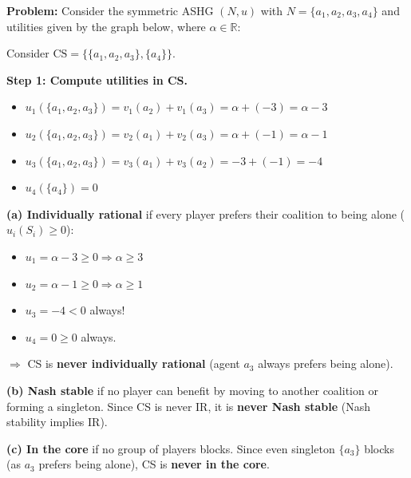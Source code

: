 \begin{exbox}
\textbf{Problem:} Consider the symmetric ASHG $(N, u)$ with $N = \{a_1, a_2, a_3, a_4\}$ and utilities given by the graph below, where $\alpha \in \mathbb{R}$:

\begin{center}
\end{center}

Consider $\text{CS} = \{\{a_1, a_2, a_3\}, \{a_4\}\}$.

\textbf{Step 1: Compute utilities in CS.}
\begin{itemize}
  \item $u_1(\{a_1,a_2,a_3\}) = v_1(a_2) + v_1(a_3) = \alpha + (-3) = \alpha - 3$
  \item $u_2(\{a_1,a_2,a_3\}) = v_2(a_1) + v_2(a_3) = \alpha + (-1) = \alpha - 1$
  \item $u_3(\{a_1,a_2,a_3\}) = v_3(a_1) + v_3(a_2) = -3 + (-1) = -4$
  \item $u_4(\{a_4\}) = 0$
\end{itemize}

\textbf{(a) Individually rational} if every player prefers their coalition to being alone ($u_i(S_i) \geq 0$):
\begin{itemize}
  \item $u_1 = \alpha - 3 \geq 0 \Rightarrow \alpha \geq 3$
  \item $u_2 = \alpha - 1 \geq 0 \Rightarrow \alpha \geq 1$
  \item $u_3 = -4 < 0$ always!
  \item $u_4 = 0 \geq 0$ always.
\end{itemize}

$\Rightarrow$ CS is \textbf{never individually rational} (agent $a_3$ always prefers being alone).

\textbf{(b) Nash stable} if no player can benefit by moving to another coalition or forming a singleton. Since CS is never IR, it is \textbf{never Nash stable} (Nash stability implies IR).

\textbf{(c) In the core} if no group of players blocks. Since even singleton $\{a_3\}$ blocks (as $a_3$ prefers being alone), CS is \textbf{never in the core}.
\end{exbox}

